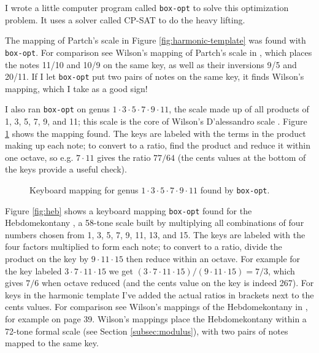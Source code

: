 \documentclass[a4paper,11pt]{article}
\begin{document}
\setlength{\fboxsep}{10pt}

I wrote a little computer program called \texttt{box-opt} to solve this
optimization problem.\footnotemark{} It uses a solver called CP-SAT to do the
heavy lifting.

The mapping of Partch's scale in Figure \ref{fig:harmonic-template} was found
with \texttt{box-opt}. For comparison see Wilson's mapping of Partch's scale in
\cite{wilson1975development}, which places the notes 11/10 and 10/9 on the same
key, as well as their inversions 9/5 and 20/11. If I let \texttt{box-opt} put
two pairs of notes on the same key, it finds Wilson's mapping, which I take as
a good sign!

I also ran \texttt{box-opt} on genus $1 {\cdot} 3 {\cdot} 5 {\cdot} 7 {\cdot} 9
{\cdot} 11$, the scale made up of all products of 1, 3, 5, 7, 9, and 11; this
scale is the core of Wilson's D'alessandro scale \cite[Figure
24]{wilson1989dal}. Figure \ref{fig:dal-reduced} shows the mapping found. The
keys are labeled with the terms in the product making up each note; to convert
to a ratio, find the product and reduce it within one octave, so e.g. $7
{\cdot} 11$ gives the ratio $77/64$ (the cents values at the bottom of the keys
provide a useful check).

\begin{figure}

\caption{Keyboard mapping for genus $1 {\cdot} 3 {\cdot} 5 {\cdot} 7 {\cdot} 9
{\cdot} 11$ found by \texttt{box-opt}.}
\label{fig:dal-reduced}
\end{figure}

Figure \ref{fig:heb} shows a keyboard mapping \texttt{box-opt} found for the
Hebdomekontany \cite{wilsonhebdomekontany}, a 58-tone scale built by
multiplying all combinations of four numbers chosen from 1, 3, 5, 7, 9, 11, 13,
and 15. The keys are labeled with the four factors multiplied to form each
note; to convert to a ratio, divide the product on the key by $9 \cdot 11 \cdot
15$ then reduce within an octave. For example for the key labeled $3 \cdot 7
\cdot 11 \cdot 15$ we get $(3 \cdot 7 \cdot 11 \cdot 15) / (9 \cdot 11 \cdot
15) = 7/3$, which gives $7/6$ when octave reduced (and the cents value on the
key is indeed 267). For keys in the harmonic template I've added the actual
ratios in brackets next to the cents values. For comparison see Wilson's
mappings of the Hebdomekontany in \cite{wilsonhebdomekontany}, for example on
page 39. Wilson's mappings place the Hebdomekontany within a 72-tone formal
scale (see Section \ref{subsec:modulus}), with two pairs of notes mapped to the
same key.
\end{document}
